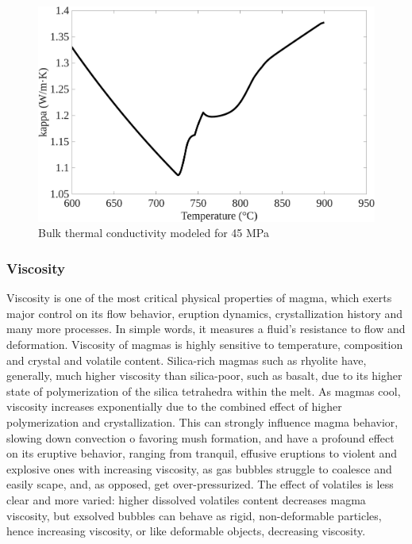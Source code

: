 \begin{figure}[H]
	\centering
	\includegraphics[width=1\linewidth]{img/chapter2/properties/kappa/SMOOTHED_kappa.png}
	\caption{Bulk thermal conductivity modeled for 45 MPa}
	\label{fig:kappa}
\end{figure}

\subsubsection{Viscosity}
Viscosity is one of the most critical physical properties of magma, which exerts major control on its flow behavior, eruption dynamics, crystallization history and many more processes. In simple words, it measures a fluid's resistance to flow and deformation. Viscosity of magmas is highly sensitive to temperature, composition and crystal and volatile content. Silica-rich magmas such as rhyolite have, generally, much higher viscosity than silica-poor, such as basalt, due to its higher state of polymerization of the silica tetrahedra within the melt. As magmas cool, viscosity increases exponentially due to the combined effect of higher polymerization and crystallization. This can strongly influence magma behavior, slowing down convection o favoring mush formation, and have a profound effect on its eruptive behavior, ranging from tranquil, effusive eruptions to violent and explosive ones with increasing viscosity, as gas bubbles struggle to coalesce and easily scape, and, as opposed, get over-pressurized. The effect of volatiles is less clear and more varied: higher dissolved volatiles content decreases magma viscosity, but exsolved bubbles can behave as rigid, non-deformable particles, hence increasing viscosity, or like deformable objects, decreasing viscosity.

